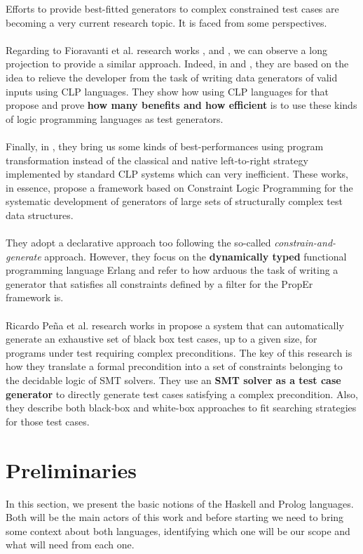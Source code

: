 \documentclass{report}
\theoremstyle{definition}
\theoremstyle{definition}
\begin{document}
Efforts to provide best-fitted generators to complex constrained test cases are becoming a very current research topic. It is faced from some perspectives.\\\\
Regarding to Fioravanti et al. research works \cite{pbtfree}, \cite{genclp} and \cite{effgenttransf}, we can observe a long projection to provide a similar approach. Indeed, in \cite{pbtfree} and \cite{genclp}, they are based on the idea to relieve the developer from the task of writing data generators of valid inputs using CLP languages. They show how using CLP languages for that propose and prove \textbf{how many benefits and how efficient} is to use these kinds of logic programming languages as test generators.\\\\
Finally, in \cite{effgenttransf}, they bring us some kinds of best-performances using program transformation instead of the classical and native left-to-right strategy implemented by standard CLP systems which can very inefficient. These works, in essence, propose a framework based on Constraint Logic Programming for the systematic development of generators of large sets of structurally complex test data structures.\\\\
They adopt a declarative approach too following the so-called \textit{constrain-and-generate} approach. However, they focus on the \textbf{dynamically typed} functional programming language Erlang and refer to how arduous the task of writing a generator that satisfies all constraints defined by a filter for the PropEr framework is.\\\\
Ricardo Peña et al. research works in \cite{smtbased} propose a system that can automatically generate an exhaustive set of black box test cases, up to a given size, for programs under test requiring complex preconditions. The key of this research is how they translate a formal precondition into a set of constraints belonging to the decidable logic of SMT solvers. They use an \textbf{SMT solver as a test case generator} to directly generate test cases satisfying a complex precondition. Also, they describe both black-box and white-box approaches to fit searching strategies for those test cases.
\pagebreak
\chapter{Preliminaries}
In this section, we present the basic notions of the Haskell and Prolog languages. Both will be the main actors of this work and before starting we need to bring some context about both languages, identifying which one will be our scope and what will need from each one.
\end{document}
